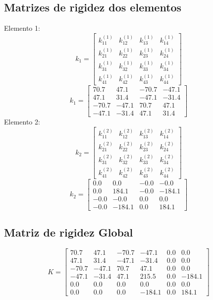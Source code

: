 \documentclass{article}%
\begin{document}
%
\subsection{Matrizes de rigidez dos elementos}%
\label{subsec:Matrizesderigidezdoselementos}%
Elemento {1}:%
\[%
k_{1}= \begin{bmatrix}%
k_{11}^{(1)}&k_{12}^{(1)}&k_{13}^{(1)}&k_{14}^{(1)}\\%
k_{21}^{(1)}&k_{22}^{(1)}&k_{23}^{(1)}&k_{24}^{(1)}\\%
k_{31}^{(1)}&k_{32}^{(1)}&k_{33}^{(1)}&k_{34}^{(1)}\\%
k_{41}^{(1)}&k_{42}^{(1)}&k_{43}^{(1)}&k_{44}^{(1)}%
\end{bmatrix}%
\]%
\[%
k_{1}= \begin{bmatrix}%
70.7&47.1&-70.7&-47.1\\%
47.1&31.4&-47.1&-31.4\\%
-70.7&-47.1&70.7&47.1\\%
-47.1&-31.4&47.1&31.4%
\end{bmatrix}%
\]%
Elemento {2}:%
\[%
k_{2}= \begin{bmatrix}%
k_{11}^{(2)}&k_{12}^{(2)}&k_{13}^{(2)}&k_{14}^{(2)}\\%
k_{21}^{(2)}&k_{22}^{(2)}&k_{23}^{(2)}&k_{24}^{(2)}\\%
k_{31}^{(2)}&k_{32}^{(2)}&k_{33}^{(2)}&k_{34}^{(2)}\\%
k_{41}^{(2)}&k_{42}^{(2)}&k_{43}^{(2)}&k_{44}^{(2)}%
\end{bmatrix}%
\]%
\[%
k_{2}= \begin{bmatrix}%
0.0&0.0&-0.0&-0.0\\%
0.0&184.1&-0.0&-184.1\\%
-0.0&-0.0&0.0&0.0\\%
-0.0&-184.1&0.0&184.1%
\end{bmatrix}%
\]

%
\subsection{Matriz de rigidez Global}%
\label{subsec:MatrizderigidezGlobal}%
\[%
K= \begin{bmatrix}%
70.7&47.1&-70.7&-47.1&0.0&0.0\\%
47.1&31.4&-47.1&-31.4&0.0&0.0\\%
-70.7&-47.1&70.7&47.1&0.0&0.0\\%
-47.1&-31.4&47.1&215.5&0.0&-184.1\\%
0.0&0.0&0.0&0.0&0.0&0.0\\%
0.0&0.0&0.0&-184.1&0.0&184.1%
\end{bmatrix}%
\]

%
\end{document}
